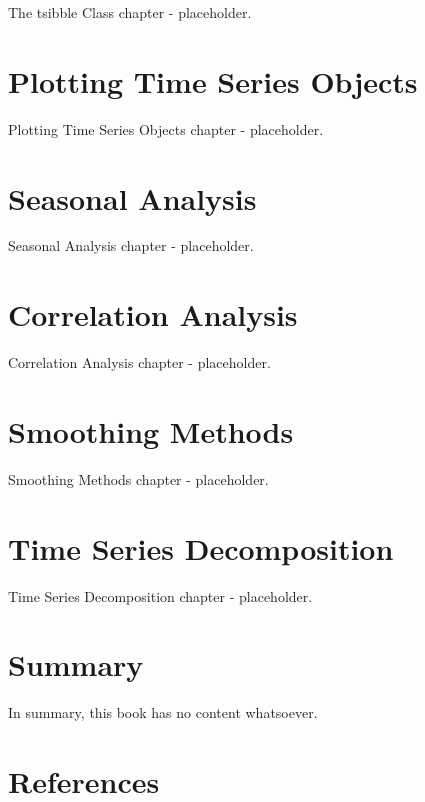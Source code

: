 \documentclass[
  letterpaper,
  DIV=11,
  numbers=noendperiod]{scrreprt}
\newlength{\cslhangindent}
\newlength{\cslentryspacingunit} %
\newenvironment{CSLReferences}[2] %
 {%
  \setlength{\parindent}{0pt}
  \ifodd #1
  \let\oldpar\par
  \def\par{\hangindent=\cslhangindent\oldpar}
  \fi
  \setlength{\parskip}{#2\cslentryspacingunit}
 }%
 {}
\begin{document}
The tsibble Class chapter - placeholder.


\hypertarget{plotting-time-series-objects}{%
\chapter{Plotting Time Series
Objects}\label{plotting-time-series-objects}}

Plotting Time Series Objects chapter - placeholder.


\hypertarget{seasonal-analysis}{%
\chapter{Seasonal Analysis}\label{seasonal-analysis}}

Seasonal Analysis chapter - placeholder.


\hypertarget{correlation-analysis}{%
\chapter{Correlation Analysis}\label{correlation-analysis}}

Correlation Analysis chapter - placeholder.


\hypertarget{smoothing-methods}{%
\chapter{Smoothing Methods}\label{smoothing-methods}}

Smoothing Methods chapter - placeholder.


\hypertarget{time-series-decomposition}{%
\chapter{Time Series Decomposition}\label{time-series-decomposition}}

Time Series Decomposition chapter - placeholder.


\hypertarget{summary}{%
\chapter{Summary}\label{summary}}

In summary, this book has no content whatsoever.


\hypertarget{references}{%
\chapter*{References}\label{references}}

\hypertarget{refs}{}
\begin{CSLReferences}{0}{0}
\end{CSLReferences}
\end{document}
